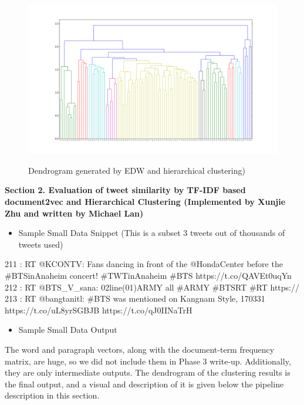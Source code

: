 \documentclass[10pt]{article}
\begin{document}
\begin{itemize}
\begin{figure}[h]
	\caption{Dendrogram generated by EDW and hierarchical clustering)}
	\centering
	\includegraphics[scale=0.3]{figure_1_hcluster.png}
	\label{fig1}
\end{figure}


\end{itemize}
{\bf Section 2. Evaluation of tweet similarity by TF-IDF based document2vec and Hierarchical Clustering (Implemented by Xunjie Zhu and written by Michael Lan) }

\begin{itemize}
	\item Sample Small Data Snippet (This is a subset 3 tweets out of thousands of tweets used)
\end{itemize}
211 : RT @KCONTV: Fans dancing in front of the @HondaCenter before the \#BTSinAnaheim concert! \#TWTinAnaheim \#BTS https://t.co/QAVEt0uqYn
212 : RT @BTS\_V\_sana:   02line(01)ARMY  all    \#ARMY  \#BTSRT  \#RT https://
213 : RT @bangtanitl: \#BTS was mentioned on Kangnam Style, 170331 https://t.co/uL8yrSGBJB https://t.co/qJ0IINaTrH

\begin{itemize}
	\item Sample Small Data Output
\end{itemize}
The word and paragraph vectors, along with the document-term frequency matrix, are huge, so we did not include them in Phase 3 write-up. Additionally, they are only intermediate outputs. The dendrogram of the clustering results is the final output, and a visual and description of it is given below the pipeline description in this section.
\end{document}
